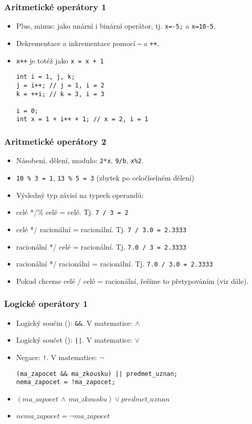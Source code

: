 \documentclass{beamer}
\newenvironment{itemizex}%
  {\large \begin{itemize}%
    \setlength{\itemsep}{8pt}%
    \setlength{\parskip}{8pt}}%
  {\end{itemize}}
\begin{document}
\begin{frame}[t,fragile]\frametitle{Aritmetické operátory 1} 
  \begin{itemizex}
    \item Plus, minus: jako unární i binární operátor, tj. \texttt{x=-5;} a \texttt{x=10-5}.
    \item Dekrementace a inkrementace pomocí \texttt{--} a \texttt{++}.
    \item \texttt{x++} je totéž jako \texttt{x = x + 1}
    \begin{verbatim} 
int i = 1, j, k;
j = i++; // j = 1, i = 2
k = ++i; // k = 3, i = 3

i = 0;
int x = 1 + i++ + 1; // x = 2, i = 1
    \end{verbatim}
  \end{itemizex}
\end{frame}


\begin{frame}[t,fragile]\frametitle{Aritmetické operátory 2} 
  \begin{itemize}
    \item Násobení, dělení, modulo: \texttt{2*x}, \texttt{9/b}, \texttt{x\%2}.
    \item \texttt{10 \% 3 = 1}, \texttt{13 \% 5 = 3} (zbytek po celočíselném dělení)
    \item Výsledný typ závisí na typech operandů:
    \item celé */\% celé = celé. Tj. \texttt{7 / 3 = 2}
    \item celé */ racionální = racionální. Tj. \texttt{7 / 3.0 = 2.3333}
    \item racionální */ celé = racionální. Tj. \texttt{7.0 / 3 = 2.3333}
    \item racionální */ racionální = racionální. Tj. \texttt{7.0 / 3.0 = 2.3333}
    \item Pokud chceme celé / celé = racionální, řešíme to přetypováním (viz dále).
  \end{itemize}
\end{frame}


\begin{frame}[t,fragile]\frametitle{Logické operátory 1} 
  \begin{itemizex}
    \item Logický součin (): \texttt{\&\&}. V matematice: $\wedge$
    \item Logický součet (): \texttt{||}. V matematice: $\vee$
    \item Negace: \texttt{!}. V matematice: $\neg$
    \begin{verbatim} 
(ma_zapocet && ma_zkousku) || predmet_uznan;
nema_zapocet = !ma_zapocet;
    \end{verbatim}
    \item $(ma\_zapocet\,\wedge\,ma\_zkousku)\vee predmet\_uznan$
    \item $nema\_zapocet = \neg ma\_zapocet$
  \end{itemizex}
\end{frame}
\end{document}
